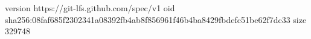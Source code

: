 version https://git-lfs.github.com/spec/v1
oid sha256:08faf685f2302341a08392fb4ab8f856961f46b4ba8429fbdefc51be62f7dc33
size 329748
